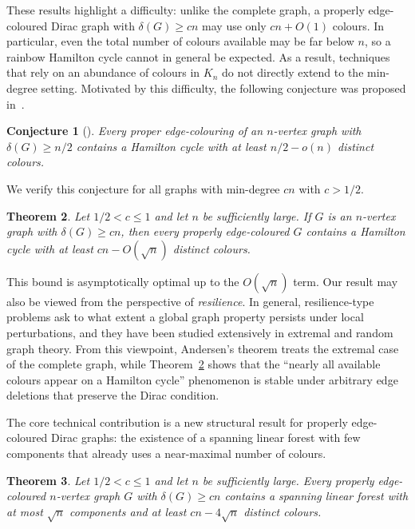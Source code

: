 \documentclass[11pt,reqno]{amsart}
\newtheorem{theorem}{Theorem}[section]
\newtheorem{conjecture}[theorem]{Conjecture}
\theoremstyle{definition}
\theoremstyle{remark}
\renewcommand\le{\leqslant}
\renewcommand\ge{\geqslant}
\begin{document}
These results highlight a difficulty: unlike the complete
graph, a properly edge-coloured Dirac graph with $\delta(G)\ge cn$ may use only $cn+O(1)$ colours. In particular, even the total number of colours available may be far below $n$, so a rainbow Hamilton cycle cannot in general be expected.
As a result, techniques that rely on an abundance of colours in $K_n$ do
not directly extend to the min-degree setting. Motivated by this difficulty, the following conjecture was proposed in~\cite{PY}.
\begin{conjecture}[\cite{PY}]\label{conj:PY}
   Every proper edge-colouring of an $n$-vertex graph with $\delta(G)\ge n/2$ contains a Hamilton cycle with at least $n/2-o(n)$ distinct colours.   
\end{conjecture}


We verify this conjecture for all graphs with min-degree $cn$ with $c>1/2$.

\begin{theorem}\label{thm:main}
Let $1/2<c\le1$ and let $n$ be sufficiently large.
If $G$ is an $n$-vertex graph with $\delta(G)\ge cn$, then every properly
edge-coloured $G$ contains a Hamilton cycle with at least
$cn-O(\sqrt n)$ distinct colours.
\end{theorem}

This bound is asymptotically optimal up to the $O(\sqrt n)$ term. Our result may also be viewed from the perspective of \emph{resilience}.
In general, resilience-type problems ask to what extent a global graph property
persists under local perturbations, and they have been studied extensively in
extremal and random graph theory.
From this viewpoint, Andersen’s theorem treats the extremal case of the complete
graph, while Theorem~\ref{thm:main} shows that the ``nearly all available colours appear on a Hamilton cycle'' phenomenon is stable under arbitrary edge deletions that preserve the Dirac condition.

The core technical contribution is a new structural result for properly edge-coloured Dirac graphs: the existence of a
spanning linear forest with few components that already uses a
near-maximal number of colours.

\begin{theorem}\label{thm:pathforest}
Let $1/2<c\le1$ and let $n$ be sufficiently large.
Every properly edge-coloured $n$-vertex graph $G$ with $\delta(G)\ge cn$
contains a spanning linear forest with at most $\sqrt n$ components and at
least $cn-4\sqrt n$ distinct colours.
\end{theorem}
\end{document}
